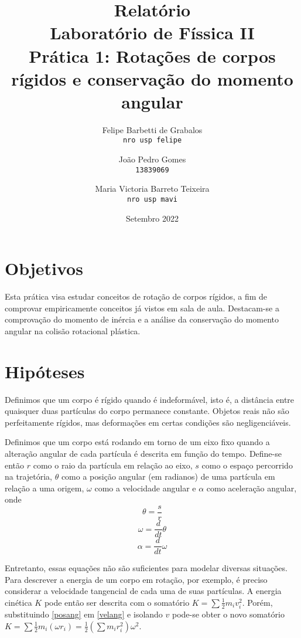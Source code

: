 \documentclass[a4paper, 12pt]{article}
\title{Relatório\\
Laboratório de Físsica II\\
Prática 1: Rotações de corpos rígidos e conservação do momento angular}
\author{Felipe Barbetti de Grabalos\\
\texttt{nro usp felipe}
\and
João Pedro Gomes\\
\texttt{13839069}
\and
Maria Victoria Barreto Teixeira\\
\texttt{nro usp mavi}
}
\date{Setembro 2022}
\begin{document}
\maketitle

\section{Objetivos}
    Esta prática visa estudar conceitos de rotação de corpos rígidos, a fim de comprovar empiricamente conceitos já vistos em sala de aula. Destacam-se a comprovação do momento de inércia e a análise da conservação do momento angular na colisão rotacional plástica.

\section{Hipóteses}
    Definimos que um corpo é rígido quando é indeformável, isto é, a distância entre quaisquer duas partículas do corpo permanece constante. Objetos reais não são perfeitamente rígidos, mas deformações em certas condições são negligenciáveis.
    \par
    Definimos que um corpo está rodando em torno de um eixo fixo quando a alteração angular de cada partícula é descrita em função do tempo. Define-se então $r$ como o raio da partícula em relação ao eixo, $s$ como o espaço percorrido na trajetória, $\theta$ como a posição angular (em radianos) de uma partícula em relação a uma origem, $\omega$ como a velocidade angular e $\alpha$ como aceleração angular, onde
    \begin{equation}
        \label{posang}
        \theta = \frac{s}{r}
    \end{equation}
    \begin{equation}
        \label{velang}
        \omega = \frac{d}{dt}\theta
    \end{equation}
    \begin{equation}
        \label{acang}
        \alpha = \frac{d}{dt}\omega
    \end{equation}
    \par
    Entretanto, essas equações não são suficientes para modelar diversas situações. Para descrever a energia de um corpo em rotação, por exemplo, é preciso considerar a velocidade tangencial de cada uma de suas partículas. A energia cinética $K$ pode então ser descrita com o somatório $K = \sum \frac{1}{2} m_iv_i^2$. Porém, substituindo \eqref{posang} em \eqref{velang} e isolando $v$ pode-se obter o novo somatório $K = \sum \frac{1}{2} m_i(\omega r_i) = \frac{1}{2} (\sum m_i r_i^2) \omega^2$.
\end{document}
